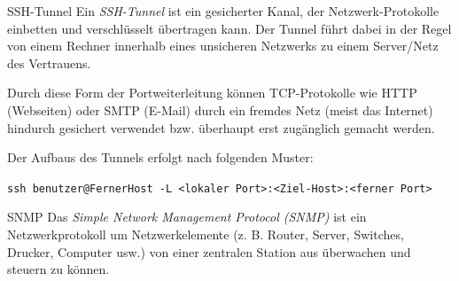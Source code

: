 \begin{bonus}{SSH-Tunnel}
    Ein \emph{SSH-Tunnel} ist ein gesicherter Kanal, der Netzwerk-Protokolle einbetten und verschlüsselt übertragen kann. Der Tunnel führt dabei in der Regel von einem Rechner innerhalb eines unsicheren Netzwerks zu einem Server/Netz des Vertrauens.

    Durch diese Form der Portweiterleitung können TCP-Protokolle wie HTTP (Webseiten) oder SMTP (E-Mail) durch ein fremdes Netz (meist das Internet) hindurch gesichert verwendet bzw. überhaupt erst zugänglich gemacht werden.

    Der Aufbaus des Tunnels erfolgt nach folgenden Muster:

    \centering
    \texttt{ssh benutzer@FernerHost -L <lokaler Port>:<Ziel-Host>:<ferner Port>}
\end{bonus}

\begin{bonus}{SNMP}
    Das \emph{Simple Network Management Protocol (SNMP)}  ist ein Netzwerkprotokoll um Netzwerkelemente (z. B. Router, Server, Switches, Drucker, Computer usw.) von einer zentralen Station aus überwachen und steuern zu können.
\end{bonus}